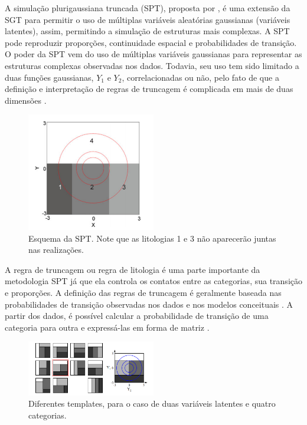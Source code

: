 A simulação plurigaussiana truncada (SPT), proposta por , é uma extensão da SGT para permitir o uso de múltiplas variáveis aleatórias gaussianas (variáveis latentes), assim, permitindo a simulação de estruturas mais complexas. A SPT pode reproduzir proporções, continuidade espacial e probabilidades de transição. O poder da SPT vem do uso de múltiplas variáveis gaussianas para representar as estruturas complexas observadas nos dados. Todavia, seu uso tem sido limitado a duas funções gaussianas, $Y_1$ e $Y_2$, correlacionadas ou não, pelo fato de que a definição e interpretação de regras de truncagem é complicada em mais de duas dimensões \cite{hier_plurigauss}.

\begin{figure}[H]
	\caption{\label{trunc_pluri}Esquema da SPT. Note que as litologias 1 e 3 não aparecerão juntas nas realizações.}
	\begin{center}
		\includegraphics[width=0.5\textwidth]{capitulo_3/pluri_sketch.png}
	\end{center}
\end{figure}

A regra de truncagem ou regra de litologia é uma parte importante da metodologia SPT já que ela controla os contatos entre as categorias, sua transição e proporções. A definição das regras de truncagem é geralmente baseada nas probabilidades de transição observadas nos dados e nos modelos conceituais \cite{mariethoz2009truncated}. A partir dos dados, é possível calcular a probabilidade de transição de uma categoria para outra e expressá-las em forma de matriz \cite{advances_in_spt}.

\begin{figure}[H]
	\caption{\label{trunc_rules}Diferentes templates, para o caso de duas variáveis latentes e quatro categorias.}
	\begin{center}
		\includegraphics[width=0.5\textwidth]{capitulo_3/trunc_rules.png}
	\end{center}
\end{figure}

